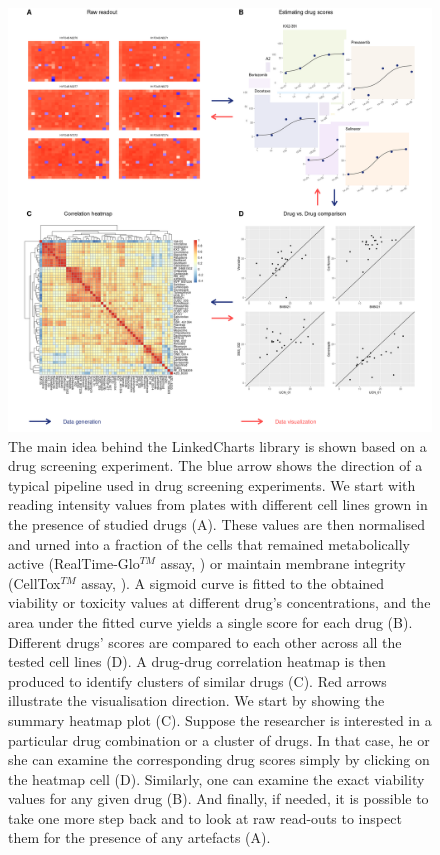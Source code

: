 \documentclass[twocolumn,10pt]{article}
\begin{document}
\begin{figure}
  \includegraphics[width=\textwidth]{FigC/figC.png}
  \caption{The main idea behind the LinkedCharts library is shown based on a drug screening experiment. The blue arrow shows the direction of a typical pipeline used in drug screening experiments. We start with reading intensity values from plates with different cell lines grown in the presence of studied drugs (A). These values are then normalised and urned into a fraction of the cells that remained metabolically active (RealTime-Glo$^{TM}$ assay, \citep{rtg}) or maintain membrane integrity (CellTox$^{TM}$ assay, \citep{ctx}). A sigmoid curve is fitted to the obtained viability or toxicity values at different drug's concentrations, and the area under the fitted curve yields a single score for each drug (B). Different drugs' scores are compared to each other across all the tested cell lines (D). A drug-drug correlation heatmap is then produced to identify clusters of similar drugs (C). Red arrows illustrate the visualisation direction. We start by showing the summary heatmap plot (C). Suppose the researcher is interested in a particular drug combination or a cluster of drugs. In that case, he or she can examine the corresponding drug scores simply by clicking on the heatmap cell (D). Similarly, one can examine the exact viability values for any given drug (B). And finally, if needed, it is possible to take one more step back and to look at raw read-outs to inspect them for the presence of any artefacts (A).}
  \label{FigC}
\end{figure}
\end{document}

